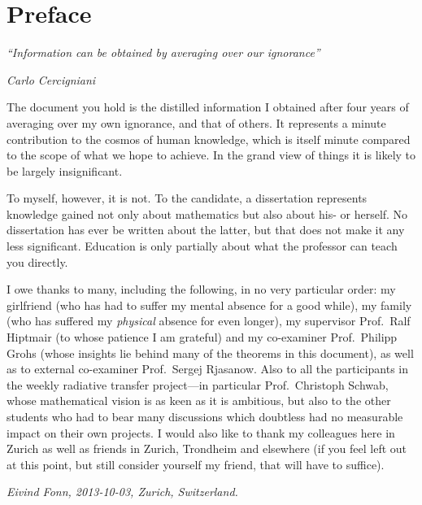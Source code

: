 \chapter*{Preface}

\vspace{-0.1cm}
\begin{quoting}
    {\em ``Information can be obtained by averaging over our ignorance''}
    \begin{flushright}
        \vspace{-0.1cm}
        {\em Carlo Cercigniani}
    \end{flushright}
\end{quoting}
\vspace{-0.1cm}

The document you hold is the distilled information I obtained after four years of averaging over my own
ignorance, and that of others. It represents a minute contribution to the cosmos of human knowledge, which is
itself minute compared to the scope of what we hope to achieve. In the grand view of things it is likely to be
largely insignificant.

To myself, however, it is not. To the candidate, a dissertation represents knowledge gained not only about
mathematics but also about his- or herself. No dissertation has ever be written about the latter, but that
does not make it any less significant. Education is only partially about what the professor can teach you
directly.

I owe thanks to many, including the following, in no very particular order: my girlfriend (who has had to
suffer my mental absence for a good while), my family (who has suffered my {\em physical} absence for even
longer), my supervisor Prof.~Ralf Hiptmair (to whose patience I am grateful) and my co-examiner Prof.~Philipp
Grohs (whose insights lie behind many of the theorems in this document), as well as to external co-examiner
Prof.~Sergej Rjasanow. Also to all the participants in the weekly radiative transfer project---in particular
Prof.~Christoph Schwab, whose mathematical vision is as keen as it is ambitious, but also to the other
students who had to bear many discussions which doubtless had no measurable impact on their own projects. I
would also like to thank my colleagues here in Zurich as well as friends in Zurich, Trondheim and
elsewhere (if you feel left out at this point, but still consider yourself my friend, that will have to
suffice).

\begin{flushright}{\em
    Eivind Fonn,
    2013-10-03,
    Zurich, Switzerland.
}\end{flushright}
